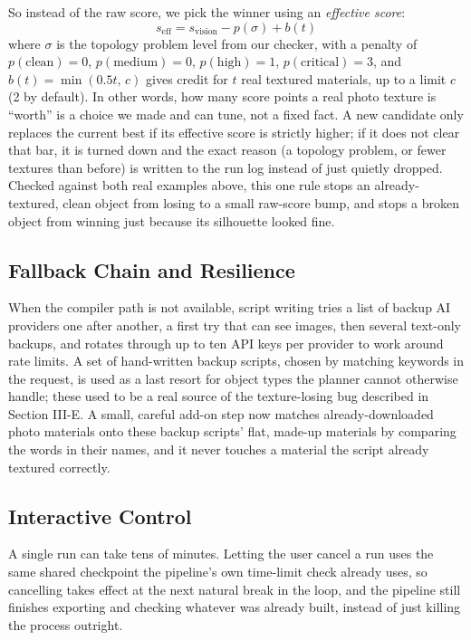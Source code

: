 \documentclass[conference]{IEEEtran}
\begin{document}
So instead of the raw score, we pick the winner using an \emph{effective score}:
\begin{equation}
s_{\mathrm{eff}} = s_{\mathrm{vision}} - p(\sigma) + b(t)
\label{eq:effscore}
\end{equation}
where $\sigma$ is the topology problem level from our checker, with a penalty of $p(\text{clean})=0$, $p(\text{medium})=0$, $p(\text{high})=1$, $p(\text{critical})=3$, and $b(t)=\min(0.5t,\,c)$ gives credit for $t$ real textured materials, up to a limit $c$ (2 by default). In other words, how many score points a real photo texture is ``worth'' is a choice we made and can tune, not a fixed fact. A new candidate only replaces the current best if its effective score is strictly higher; if it does not clear that bar, it is turned down and the exact reason (a topology problem, or fewer textures than before) is written to the run log instead of just quietly dropped. Checked against both real examples above, this one rule stops an already-textured, clean object from losing to a small raw-score bump, and stops a broken object from winning just because its silhouette looked fine.

\subsection{Fallback Chain and Resilience}
When the compiler path is not available, script writing tries a list of backup AI providers one after another, a first try that can see images, then several text-only backups, and rotates through up to ten API keys per provider to work around rate limits. A set of hand-written backup scripts, chosen by matching keywords in the request, is used as a last resort for object types the planner cannot otherwise handle; these used to be a real source of the texture-losing bug described in Section III-E. A small, careful add-on step now matches already-downloaded photo materials onto these backup scripts' flat, made-up materials by comparing the words in their names, and it never touches a material the script already textured correctly.

\subsection{Interactive Control}
A single run can take tens of minutes. Letting the user cancel a run uses the same shared checkpoint the pipeline's own time-limit check already uses, so cancelling takes effect at the next natural break in the loop, and the pipeline still finishes exporting and checking whatever was already built, instead of just killing the process outright.
\end{document}
